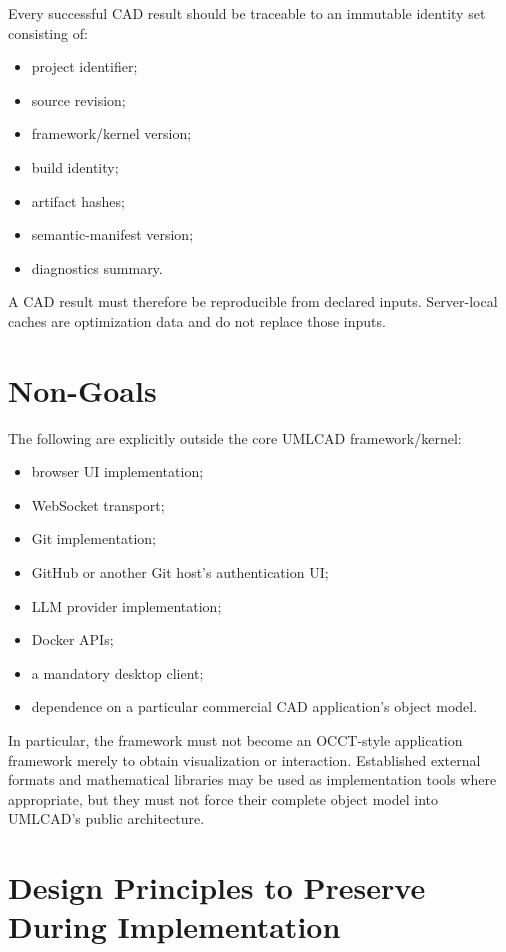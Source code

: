 \documentclass[11pt,a4paper]{article}
\begin{document}
Every successful CAD result should be traceable to an immutable identity set consisting of:
\begin{itemize}
    \item project identifier;
    \item source revision;
    \item framework/kernel version;
    \item build identity;
    \item artifact hashes;
    \item semantic-manifest version;
    \item diagnostics summary.
\end{itemize}

A CAD result must therefore be reproducible from declared inputs. Server-local caches are optimization data and do not replace those inputs.

\section{Non-Goals}

The following are explicitly outside the core UMLCAD framework/kernel:
\begin{itemize}
    \item browser UI implementation;
    \item WebSocket transport;
    \item Git implementation;
    \item GitHub or another Git host's authentication UI;
    \item LLM provider implementation;
    \item Docker APIs;
    \item a mandatory desktop client;
    \item dependence on a particular commercial CAD application's object model.
\end{itemize}

In particular, the framework must not become an OCCT-style application framework merely to obtain visualization or interaction. Established external formats and mathematical libraries may be used as implementation tools where appropriate, but they must not force their complete object model into UMLCAD's public architecture.

\section{Design Principles to Preserve During Implementation}
\end{document}
